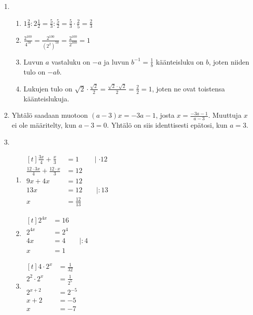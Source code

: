 \documentclass[12pt,fleqn]{article}
\begin{document}
\begin{enumerate}[label=\textbf{\arabic*.}]
\item 
\begin{enumerate}[label=\textbf{\alph*)}]
\item \(\displaystyle 1\frac{2}{3}:2\frac{1}{2}=\frac{5}{3}:\frac{5}{2}=\frac{5}{3}\cdot \frac{2}{5}=\frac{2}{3}\)
\item \(\displaystyle \frac{2^{100}}{4^{50}}=\frac{2^{100}}{(2^2)^{50}}=\frac{2^{100}}{2^{100}}=1\)
\item Luvun \(a\) vastaluku on \(-a\) ja luvun \(\displaystyle b^{-1}=\frac{1}{b}\) käänteisluku on \(b\), joten niiden tulo on \(-ab\).
\item Lukujen tulo on \(\displaystyle \sqrt{2}\cdot \frac{\sqrt{2}}{2}=\frac{\sqrt{2}\cdot \sqrt{2}}{2}=\frac{2}{2}=1\), joten ne ovat toistensa käänteislukuja.
\end{enumerate}

\item Yhtälö saadaan muotoon \((a-3)x=-3a-1\), josta \(\displaystyle x=\frac{-3a-1}{a-3}\). Muuttuja \(x\) ei ole määritelty, kun \(a-3=0\). Yhtälö on siis identtisesti epätosi, kun \(a=3\).

\item 
\begin{enumerate}[label=\textbf{\alph*)}]
\item
$\begin{aligned}[t]
    \displaystyle \frac{3x}{4}+\frac{x}{3}&=1 \qquad \mid \cdot 12 \\
    \frac{12\cdot 3x}{4}+\frac{12\cdot x}{3}&=12 \\
    9x+4x&=12 \\
    13x&=12 \qquad \mid :13 \\
    x&=\frac{12}{13}
\end{aligned}$ 

\item $\begin{aligned}[t]
    \displaystyle 
    2^{4x}&=16 \\
    2^{4x}&=2^4 \\
    4x&=4 \qquad \mid :4 \\
    x&=1
\end{aligned}$ 

\item $\begin{aligned}[t]
    \displaystyle 
    4\cdot 2^x&=\frac{1}{32} \\
    2^2\cdot 2^x&=\frac{1}{2^5} \\
    2^{x+2}&=2^{-5} \\
    x+2&=-5 \\
    x&=-7
\end{aligned}$ 


\end{enumerate}
\end{enumerate}
\end{document}

